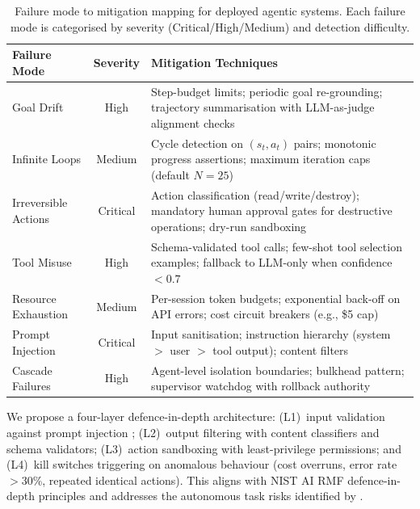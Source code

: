 \documentclass[review]{elsarticle}
\theoremstyle{definition}
\begin{document}
\begin{table}[ht]
\centering
\caption{Failure mode to mitigation mapping for deployed agentic systems. Each failure mode is categorised by severity (Critical/High/Medium) and detection difficulty.}
\label{tab:failures}
\begin{tabular}{p{2.5cm}cp{8cm}}
\toprule
\textbf{Failure Mode} & \textbf{Severity} & \textbf{Mitigation Techniques} \\
\midrule
Goal Drift & High & Step-budget limits; periodic goal re-grounding; trajectory summarisation with LLM-as-judge alignment checks \citep{zheng2024judging} \\
Infinite Loops & Medium & Cycle detection on $(s_t, a_t)$ pairs; monotonic progress assertions; maximum iteration caps (default $N{=}25$) \\
Irreversible Actions & Critical & Action classification (read/write/destroy); mandatory human approval gates for destructive operations; dry-run sandboxing \\
Tool Misuse & High & Schema-validated tool calls; few-shot tool selection examples; fallback to LLM-only when confidence $< 0.7$ \\
Resource Exhaustion & Medium & Per-session token budgets; exponential back-off on API errors; cost circuit breakers (e.g., \$5 cap) \\
Prompt Injection & Critical & Input sanitisation; instruction hierarchy (system $>$ user $>$ tool output); content filters \citep{greshake2023not,guardrailsai2024} \\
Cascade Failures & High & Agent-level isolation boundaries; bulkhead pattern; supervisor watchdog with rollback authority \\
\bottomrule
\end{tabular}
\end{table}

We propose a four-layer defence-in-depth architecture: (L1)~input validation against prompt injection \citep{greshake2023not}; (L2)~output filtering with content classifiers and schema validators; (L3)~action sandboxing with least-privilege permissions; and (L4)~kill switches triggering on anomalous behaviour (cost overruns, error rate $>$30\%, repeated identical actions). This aligns with NIST AI RMF \citep{nist2023ai} defence-in-depth principles and addresses the autonomous task risks identified by \citet{kinniment2024evaluating}.

\end{document}
